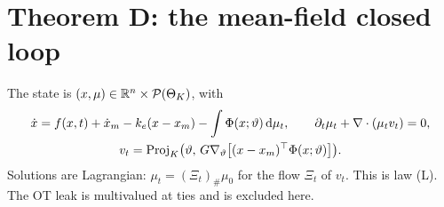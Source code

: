 \section{Theorem D: the mean-field closed loop}\label{sec:thmD}

The state is $(x,\mu)\in\mathbb{R}^n\times\mathcal{P}(\Theta_K)$, with
\begin{equation}\label{eq:thmD:loop}
\begin{gathered}
  \dot x = f(x,t) + \dot x_m - k_e(x-x_m) - \int\Phi(x;\vartheta)\,\mathrm{d}\mu_t,\qquad
  \partial_t\mu_t + \nabla\cdot(\mu_t v_t) = 0,\\
  v_t = \operatorname{Proj}_K\bigl(\vartheta,\, G\nabla_\vartheta\bigl[(x-x_m)^\top\Phi(x;\vartheta)\bigr]\bigr).
\end{gathered}
\end{equation}
Solutions are Lagrangian: $\mu_t=(\Xi_t)_\#\mu_0$ for the flow $\Xi_t$ of $v_t$. This is law (L). The OT leak is
multivalued at ties and is excluded here.

